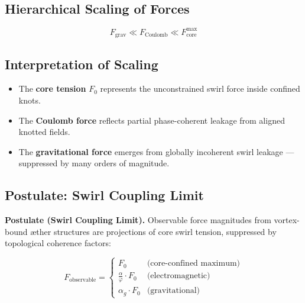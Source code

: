 \documentclass[12pt]{article}
\begin{document}
            \subsection{Hierarchical Scaling of Forces}
        
            \begin{equation}
                \boxed{
                    F_\text{grav} \ll F_\text{Coulomb} \ll F_\text{core}^{\text{max}}
                }
            \end{equation}
        
            \subsection{Interpretation of Scaling}
        
            \begin{itemize}
                \item The \textbf{core tension} \( F_0 \) represents the unconstrained swirl force inside confined knots.
                \item The \textbf{Coulomb force} reflects partial phase-coherent leakage from aligned knotted fields.
                \item The \textbf{gravitational force} emerges from globally incoherent swirl leakage — suppressed by many orders of magnitude.
            \end{itemize}
        
            \subsection{Postulate: Swirl Coupling Limit}
        
            \textbf{Postulate (Swirl Coupling Limit).} Observable force magnitudes from vortex-bound æther structures are projections of core swirl tension, suppressed by topological coherence factors:
        
            \begin{equation}
            F_{\text{observable}} = \left\{
            \begin{array}{ll}
            F_0 & \text{(core-confined maximum)} \\
            \frac{\alpha}{\varphi} \cdot F_0 & \text{(electromagnetic)} \\
            \alpha_g \cdot F_0 & \text{(gravitational)}
            \end{array}
            \right.
            \end{equation}
        
\end{document}
